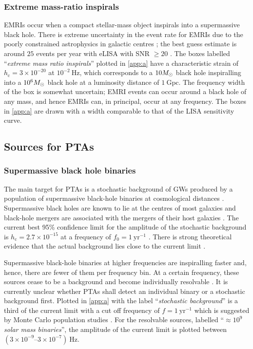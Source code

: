 \subsubsection{Extreme mass-ratio inspirals}

EMRIs occur when a compact stellar-mass object inspirals into a supermassive black hole. There is extreme uncertainty in the event rate for EMRIs due to the poorly constrained astrophysics in galactic centres \citep[e.g.,][]{Merritt2011}; the best guess estimate is around $25$ events per year with eLISA with SNR $\ge 20$ \citep{TheGravitationalUniverse}. The boxes labelled ``\emph{extreme mass ratio inspirals}'' plotted in \ref{app:a} have a characteristic strain of $h_\mathrm{c}=3\times 10^{-20}$ at $10^{-2}~\mathrm{Hz}$, which corresponds to a $10M_{ \odot }$ black hole inspiralling into a $10^{6}M_{ \odot }$ black hole at a luminosity distance of $1~\mathrm{Gpc}$. The frequency width of the box is somewhat uncertain; EMRI events can occur around a black hole of any mass, and hence EMRIs can, in principal, occur at any frequency. The boxes in \ref{app:a} are drawn with a width comparable to that of the LISA sensitivity curve.




\subsection{Sources for PTAs}

\subsubsection{Supermassive black hole binaries}

The main target for PTAs is a stochastic background of GWs produced by a population of supermassive black-hole binaries at cosmological distances \citep{SesanaVecchioColancino}. Supermassive black holes are known to lie at the centres of most galaxies and black-hole mergers are associated with the mergers of their host galaxies \citep{Volonteri2003,Ferrarese2005}. The current best 95\% confidence limit for the amplitude of the stochastic background is $h_\mathrm{c} = 2.7\times 10^{-15}$ at a frequency of $f_{0}=1~\mathrm{yr}^{-1}$ \citep{Shannon2013}. There is strong theoretical evidence that the actual background lies close to the current limit \citep{Sesana-2012}. 

Supermassive black-hole binaries at higher frequencies are inspiralling faster and, hence, there are fewer of them per frequency bin. At a certain frequency, these sources cease to be a background and become individually resolvable . It is currently unclear whether PTAs shall detect an individual binary or a stochastic background first. Plotted in \ref{app:a} with the label ``\emph{stochastic background}'' is a third of the current limit with a cut off frequency of $f=1~\mathrm{yr}^{-1}$ which is suggested by Monte Carlo population studies \citep{SesanaVecchioColancino}. For the resolvable sources, labelled ``\emph{$\mathit{\approx 10^{9}}$ solar mass binaries}'', the amplitude of the current limit is plotted between $\left(3\times 10^{-9}\right.$--$\left.3\times 10^{-7}\right)~\mathrm{Hz}$.




